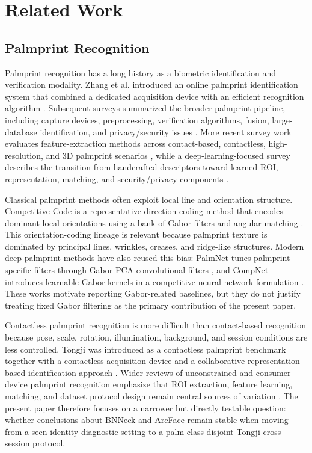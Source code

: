 \section{Related Work}

\subsection{Palmprint Recognition}

Palmprint recognition has a long history as a biometric identification and verification modality. Zhang et al. introduced an online palmprint identification system that combined a dedicated acquisition device with an efficient recognition algorithm \cite{zhang2003online}. Subsequent surveys summarized the broader palmprint pipeline, including capture devices, preprocessing, verification algorithms, fusion, large-database identification, and privacy/security issues \cite{kong2009survey}. More recent survey work evaluates feature-extraction methods across contact-based, contactless, high-resolution, and 3D palmprint scenarios \cite{fei2019feature}, while a deep-learning-focused survey describes the transition from handcrafted descriptors toward learned ROI, representation, matching, and security/privacy components \cite{gao2025deeplearning}.

Classical palmprint methods often exploit local line and orientation structure. Competitive Code is a representative direction-coding method that encodes dominant local orientations using a bank of Gabor filters and angular matching \cite{kong2004competitive}. This orientation-coding lineage is relevant because palmprint texture is dominated by principal lines, wrinkles, creases, and ridge-like structures. Modern deep palmprint methods have also reused this bias: PalmNet tunes palmprint-specific filters through Gabor-PCA convolutional filters \cite{genovese2019palmnet}, and CompNet introduces learnable Gabor kernels in a competitive neural-network formulation \cite{liang2021compnet}. These works motivate reporting Gabor-related baselines, but they do not justify treating fixed Gabor filtering as the primary contribution of the present paper.

Contactless palmprint recognition is more difficult than contact-based recognition because pose, scale, rotation, illumination, background, and session conditions are less controlled. Tongji was introduced as a contactless palmprint benchmark together with a contactless acquisition device and a collaborative-representation-based identification approach \cite{zhang2017tongji}. Wider reviews of unconstrained and consumer-device palmprint recognition emphasize that ROI extraction, feature learning, matching, and dataset protocol design remain central sources of variation \cite{ungureanu2020toward}. The present paper therefore focuses on a narrower but directly testable question: whether conclusions about BNNeck and ArcFace remain stable when moving from a seen-identity diagnostic setting to a palm-class-disjoint Tongji cross-session protocol.


